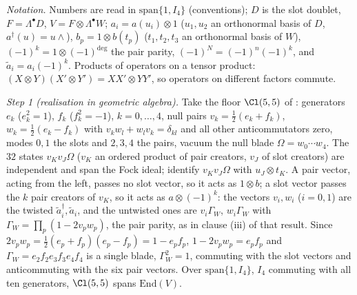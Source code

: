 \emph{Notation.} Numbers are read in $\mathrm{span}\{1, I_{4}\}$ (conventions); $D$ is the slot doublet, $F = \Lambda^{\bullet}D$, $V = F \otimes \Lambda^{\bullet}W$; $a_{i} = a(u_{i}) \otimes 1$ ($u_{1}, u_{2}$ an orthonormal basis of $D$, $a^{\dagger}(u) = u \wedge$), $b_{p} = 1 \otimes b(t_{p})$ ($t_{1}, t_{2}, t_{3}$ an orthonormal basis of $W$), $(-1)^{k} = 1 \otimes (-1)^{\deg}$ the pair parity, $(-1)^{N} = (-1)^{n}(-1)^{k}$, and $\tilde a_{i} = a_{i}(-1)^{k}$. Products of operators on a tensor product: $(X \otimes Y)(X' \otimes Y') = XX' \otimes YY'$, so operators on different factors commute.

\emph{Step 1 (realisation in geometric algebra).} Take the floor $\Cl(5,5)$ of : generators $e_{k}$ ($e_{k}^{2} = 1$), $f_{k}$ ($f_{k}^{2} = -1$), $k = 0, \dots, 4$, null pairs $v_{k} = \tfrac12(e_{k} + f_{k})$, $w_{k} = \tfrac12(e_{k} - f_{k})$ with $v_{k}w_{l} + w_{l}v_{k} = \delta_{kl}$ and all other anticommutators zero, modes $0, 1$ the slots and $2, 3, 4$ the pairs, vacuum the null blade $\Omega = w_{0}\cdots w_{4}$. The $32$ states $v_{K}v_{J}\Omega$ ($v_{K}$ an ordered product of pair creators, $v_{J}$ of slot creators) are independent and span the Fock ideal; identify $v_{K}v_{J}\Omega$ with $u_{J} \otimes t_{K}$. A pair vector, acting from the left, passes no slot vector, so it acts as $1 \otimes b$; a slot vector passes the $k$ pair creators of $v_{K}$, so it acts as $a \otimes (-1)^{k}$: the vectors $v_{i}, w_{i}$ ($i = 0, 1$) are the twisted $\tilde a^{\dagger}_{i}, \tilde a_{i}$, and the untwisted ones are $v_{i}\Gamma_{W}$, $w_{i}\Gamma_{W}$ with $\Gamma_{W} = \prod_{p}(1 - 2v_{p}w_{p})$, the pair parity, as in clause (iii) of that result. Since $2v_{p}w_{p} = \tfrac12(e_{p} + f_{p})(e_{p} - f_{p}) = 1 - e_{p}f_{p}$, $1 - 2v_{p}w_{p} = e_{p}f_{p}$ and $\Gamma_{W} = e_{2}f_{2}e_{3}f_{3}e_{4}f_{4}$ is a single blade, $\Gamma_{W}^{2} = 1$, commuting with the slot vectors and anticommuting with the six pair vectors. Over $\mathrm{span}\{1, I_{4}\}$, $I_{4}$ commuting with all ten generators, $\Cl(5,5)$ spans $\mathrm{End}(V)$.

